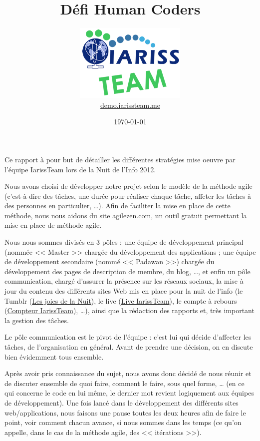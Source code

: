 \documentclass[12pt, a4paper]{article}
\title{Défi Human Coders}
\newcommand{\espace}{\vspace{.8cm}}
\begin{document}
\author{\includegraphics{../_img/iariss_team.png} \\ {\sffamily \href{http://demo.iarissteam.me}{demo.iarissteam.me}}}
\date{\today}

\maketitle{}

{\sffamily Ce rapport à pour but de détailler les différentes stratégies mise oeuvre par l'équipe IarissTeam lors de la Nuit de l'Info 2012.} 

\espace{}
Nous avons choisi de développer notre projet selon le modèle de la méthode agile (c'est-à-dire des tâches, une durée pour réaliser chaque tâche, affcter les tâches à des personnes en particulier, \ldots{}). Afin de faciliter la mise en place de cette méthode, nous nous aidons du site \href{http://www.agilezen.com/}{agilezen.com}, un outil gratuit permettant la mise en place de méthode agile.

Nous nous sommes divisés en 3 pôles : une équipe de développement principal (nommée << Master >> chargée du développement des applications ; une équipe de développement secondaire (nommé << Padawan >>) chargée du développement des pages de description de membre, du blog, \ldots{},  et enfin un pôle communication, chargé d'assurer la présence sur les réseaux sociaux, la mise à jour du contenu des différents sites Web mis en place pour la nuit de l'info (le Tumblr (\href{http://lesjoiesdelanuit.tumblr.com/}{Les joies de la Nuit}), le live (\href{http://live.iarissteam.me/}{Live IarissTeam}), le compte à rebours (\href{http://iarissteam.me/}{Compteur IarissTeam}), \ldots{}), ainsi que la rédaction des rapports et, très important la gestion des tâches.

\espace{}
Le pôle communication est le pivot de l'équipe : c'est lui qui décide d'affecter les tâches, de l'organisation en général. Avant de prendre une décision, on en discute bien évidemment tous ensemble.

Après avoir pris connaissance du sujet, nous avons donc décidé de nous réunir et de discuter ensemble de quoi faire, comment le faire, sous quel forme, \ldots{} (en ce qui concerne le code en lui même, le dernier mot revient logiquement aux équipes de développement). Une fois lancé dans le développement des différents sites web/applications, nous faisons une pause toutes les deux heures afin de faire le point, voir comment chacun avance, si nous sommes dans les temps (ce qu'on appelle, dans le cas de la méthode agile, des << itérations >>).
\end{document}
